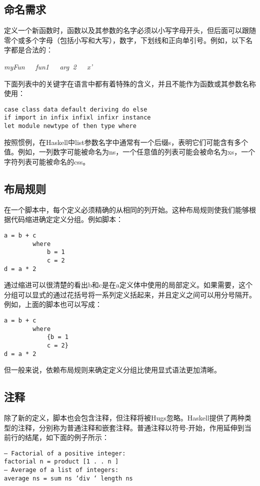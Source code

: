 \subsection{命名需求}
定义一个新函数时，函数以及其参数的名字必须以小写字母开头，但后面可以跟随零个或多个字母（包括小写和大写），数字，下划线和正向单引号。例如，以下名字都是合法的：

\textit{myFun~~~fun1~~~arg~2~~~x’}

下面列表中的关键字在语言中都有着特殊的含义，并且不能作为函数或其参数名称使用：
\begin{verbatim}
case class data default deriving do else
if import in infix infixl infixr instance
let module newtype of then type where
\end{verbatim}

按照惯例，在Haskell中list参数名字中通常有一个后缀s，表明它们可能含有多个值。例如，一列数字可能被命名为ns，一个任意值的列表可能会被命名为xs，一个字符列表可能被命名的css。

\subsection{布局规则}

在一个脚本中，每个定义必须精确的从相同的列开始。这种布局规则使我们能够根据代码缩进确定定义分组。例如脚本：

\begin{verbatim}
a = b + c
        where 
            b = 1
            c = 2
d = a * 2
\end{verbatim}

通过缩进可以很清楚的看出b和c是在a定义体中使用的局部定义。如果需要，这个分组可以显式的通过花括号将一系列定义括起来，并且定义之间可以用分号隔开。例如，上面的脚本也可以写成：

\begin{verbatim}
a = b + c
        where 
            {b = 1
            c = 2}
d = a * 2
\end{verbatim}

但一般来说，依赖布局规则来确定定义分组比使用显式语法更加清晰。

\subsection{注释}

除了新的定义，脚本也会包含注释，但注释将被Hugs忽略。Haskell提供了两种类型的注释，分别称为普通注释和嵌套注释。普通注释以符号-开始，作用延伸到当前行的结尾，如下面的例子所示：

\begin{verbatim}
— Factorial of a positive integer:
factorial n = product [1 . . n ]
— Average of a list of integers:
average ns = sum ns ‘div ‘ length ns
\end{verbatim}

